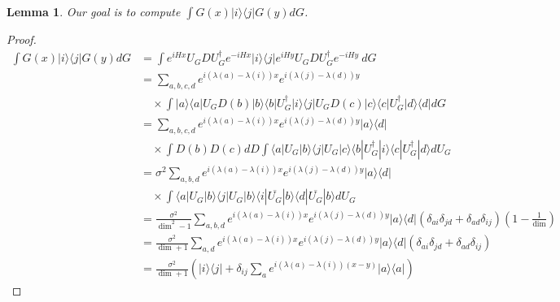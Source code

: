 \documentclass{article}
\newtheorem{lemma}[theorem]{Lemma}
\newcommand{\ket}[1]{|#1\rangle}
\newcommand{\bra}[1]{\langle #1|}
\newcommand{\ketbra}[2]{| #1\rangle\! \langle #2|}
\newcommand{\parens}[1]{\left( #1 \right)}
\begin{document}
\begin{lemma} \label{lem:sandwiched_interaction}
    Our goal is to compute $\int G(x) \ketbra{i}{j} G(y) dG$.
\end{lemma}
\begin{proof}
    \begin{align}
        \int G(x) \ketbra{i}{j} G(y) dG &=  \int e^{i H x} U_G D U_G^{\dagger} e^{-i H x} \ketbra{i}{j} e^{i H y} U_G D U_G^\dagger e^{-i H y} ~dG \\
        &= \sum_{a, b,c, d} e^{i (\lambda(a) - \lambda(i))x} e^{i (\lambda(j) - \lambda(d))y} \nonumber \\
        &\quad \times \int \ketbra{a}{a} U_G D(b) \ketbra{b}{b} U_G^\dagger \ketbra{i}{j} U_G D(c) \ketbra{c}{c} U_G^\dagger \ketbra{d}{d} dG \\
        &= \sum_{a, b,c, d}  e^{i (\lambda(a) - \lambda(i))x} e^{i (\lambda(j) - \lambda(d))y} \ketbra{a}{d} \nonumber \\
        &\quad \times \int D(b) D(c) dD \int \bra{a} U_G \ket{b} \bra{j} U_G \ket{c} \bra{b} U_G^\dagger \ket{i} \bra{c} U_G^\dagger \ket{d} dU_G \\
        &= \sigma^2 \sum_{a,b,d} e^{i (\lambda(a) - \lambda(i))x} e^{i (\lambda(j) - \lambda(d))y} \ketbra{a}{d} \nonumber \\ 
        &\quad \times \int \bra{a} U_G \ket{b} \bra{j} U_G \ket{b} \bra{i} \overline{U_G} \ket{b} \bra{d} \overline{U_G} \ket{b} dU_G \\
        &= \frac{\sigma^2}{\dim^2 - 1} \sum_{a,b,d} e^{i (\lambda(a) - \lambda(i))x} e^{i (\lambda(j) - \lambda(d))y} \ketbra{a}{d} (\delta_{ai} \delta_{jd} + \delta_{ad}\delta_{ij})\parens{1 - \frac{1}{\dim}} \\
        &= \frac{\sigma^2}{\dim + 1} \sum_{a,d} e^{i (\lambda(a) - \lambda(i))x} e^{i (\lambda(j) - \lambda(d))y} \ketbra{a}{d} (\delta_{ai} \delta_{jd} + \delta_{ad}\delta_{ij}) \\
        &= \frac{\sigma^2}{\dim + 1} \parens{\ketbra{i}{j} + \delta_{ij} \sum_{a} e^{i(\lambda(a) - \lambda(i))(x-y)} \ketbra{a}{a} }
    \end{align}
\end{proof}
\end{document}

